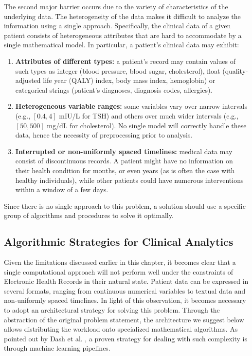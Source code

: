 The second major barrier occurs due to the variety of characteristics of the underlying data. The heterogeneity of the data makes it difficult to analyze the information using a single approach. Specifically, the clinical data of a given patient consists of heterogeneous attributes that are hard to accommodate by a single mathematical model. In particular, a patient's clinical data may exhibit:
\vspace{0.2em}
\begin{enumerate}
    \item \textbf{Attributes of different types:} a patient's record may contain values of such types as integer (blood pressure, blood sugar, cholesterol), float (quality-adjusted life year (QALY) index, body mass index, hemoglobin) or categorical strings (patient's diagnoses, diagnosis codes, allergies).

    \item \textbf{Heterogeneous variable ranges:} some variables vary over narrow intervals (e.g., $[0.4, 4]$ mIU/L for TSH) and others over much wider intervals (e.g., $[50, 500]$ mg/dL for cholesterol). No single model will correctly handle these data, hence the necessity of preprocessing prior to analysis.

    \item \textbf{Interrupted or non-uniformly spaced timelines:} medical data may consist of discontinuous records. A patient might have no information on their health condition for months, or even years (as is often the case with healthy individuals), while other patients could have numerous interventions within a window of a few days.
\end{enumerate}
\vspace{1em}
Since there is no single approach to this problem, a solution should use a specific group of algorithms and procedures to solve it optimally.
\subsection{Algorithmic Strategies for Clinical Analytics}

Given the limitations discussed earlier in this chapter, it becomes clear that a single computational approach will not perform well under the constraints of Electronic Health Records in their natural state. Patient data can be expressed in several formats, ranging from continuous numerical variables to textual data and non-uniformly spaced timelines. In light of this observation, it becomes necessary to adopt an architectural strategy for solving this problem. Through the abstraction of the original problem statement, the architecture we suggest below allows distributing the workload onto specialized mathematical algorithms. As pointed out by Dash et al. \cite{dash2019}, a proven strategy for dealing with such complexity is through machine learning pipelines.

